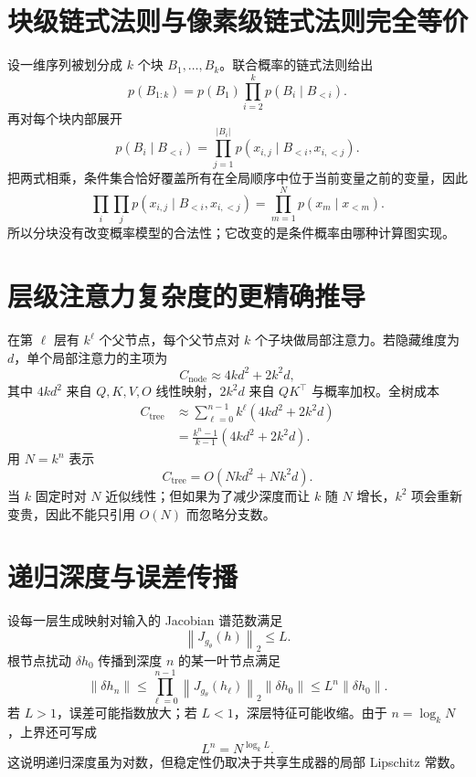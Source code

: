 \documentclass[UTF8,12pt,a4paper,fontset=none]{ctexart}
\numberwithin{equation}{section}
\newcommand{\norm}[1]{\left\lVert #1\right\rVert}
\begin{document}
\section{块级链式法则与像素级链式法则完全等价}
设一维序列被划分成 $k$ 个块 $B_1,\ldots,B_k$。联合概率的链式法则给出
\begin{equation}
 p(B_{1:k})=p(B_1)\prod_{i=2}^{k}p(B_i\mid B_{<i}).
\end{equation}
再对每个块内部展开
\begin{equation}
 p(B_i\mid B_{<i})
 =\prod_{j=1}^{|B_i|}p(x_{i,j}\mid B_{<i},x_{i,<j}).
\end{equation}
把两式相乘，条件集合恰好覆盖所有在全局顺序中位于当前变量之前的变量，因此
\begin{equation}
 \prod_i\prod_jp(x_{i,j}\mid B_{<i},x_{i,<j})
 =\prod_{m=1}^{N}p(x_m\mid x_{<m}).
\end{equation}
所以分块没有改变概率模型的合法性；它改变的是条件概率由哪种计算图实现。

\section{层级注意力复杂度的更精确推导}
在第 $\ell$ 层有 $k^\ell$ 个父节点，每个父节点对 $k$ 个子块做局部注意力。若隐藏维度为 $d$，单个局部注意力的主项为
\begin{equation}
 C_{\mathrm{node}}\approx 4kd^2+2k^2d,
\end{equation}
其中 $4kd^2$ 来自 $Q,K,V,O$ 线性映射，$2k^2d$ 来自 $QK^\top$ 与概率加权。全树成本
\begin{align}
 C_{\mathrm{tree}}
 &\approx\sum_{\ell=0}^{n-1}k^\ell(4kd^2+2k^2d)\\
 &=\frac{k^n-1}{k-1}(4kd^2+2k^2d).
\end{align}
用 $N=k^n$ 表示
\begin{equation}
 C_{\mathrm{tree}}=O\!\left(Nkd^2+Nk^2d\right).
\end{equation}
当 $k$ 固定时对 $N$ 近似线性；但如果为了减少深度而让 $k$ 随 $N$ 增长，$k^2$ 项会重新变贵，因此不能只引用 $O(N)$ 而忽略分支数。

\section{递归深度与误差传播}
设每一层生成映射对输入的 Jacobian 谱范数满足
\begin{equation}
 \norm{J_{g_\theta}(h)}_2\le L.
\end{equation}
根节点扰动 $\delta h_0$ 传播到深度 $n$ 的某一叶节点满足
\begin{equation}
 \norm{\delta h_n}
 \le\prod_{\ell=0}^{n-1}\norm{J_{g_\theta}(h_\ell)}_2\norm{\delta h_0}
 \le L^n\norm{\delta h_0}.
\end{equation}
若 $L>1$，误差可能指数放大；若 $L<1$，深层特征可能收缩。由于 $n=\log_kN$，上界还可写成
\begin{equation}
 L^n=N^{\log_kL}.
\end{equation}
这说明递归深度虽为对数，但稳定性仍取决于共享生成器的局部 Lipschitz 常数。
\end{document}
